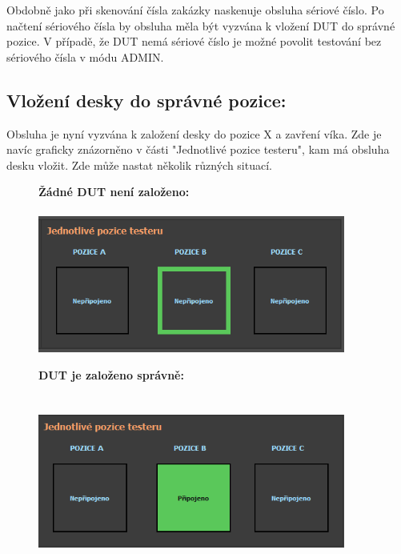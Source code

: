 Obdobně jako při skenování čísla zakázky naskenuje obsluha sériové číslo.
Po načtení sériového čísla by obsluha měla být vyzvána k vložení DUT do správné pozice.
V případě, že DUT nemá sériové číslo je možné povolit testování bez sériového čísla v módu ADMIN.

\clearpage
\subsection{Vložení desky do správné pozice:}
Obsluha je nyní vyzvána k založení desky do pozice X a zavření víka.
Zde je navíc graficky znázorněno v části "Jednotlivé pozice testeru", kam má obsluha desku vložit.
Zde může nastat několik různých situací.

\begin{figure}[ht!]
	\begin{minipage}{0.32\textwidth}
		\textbf{Žádné DUT není založeno:}\\\\
		\includegraphics[width = 0.9\textwidth]{obrazky/NO_BOARD.PNG}
		
	\end{minipage}
    \hfill
	\begin{minipage}{0.32\textwidth}
		\textbf{DUT je založeno správně:}\\\\\\
		\includegraphics[width = 0.9\textwidth]{obrazky/OK_BOARD.PNG}
		

\end{minipage}
\end{figure}
